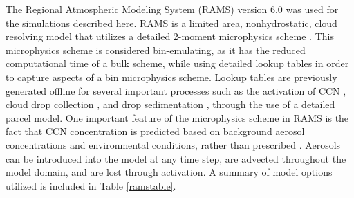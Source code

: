 The Regional Atmospheric Modeling System (RAMS) \citep{Pielke:1992p800,Cotton:2003p72} version 6.0 was used for the simulations described here.  RAMS is a limited area, nonhydrostatic, cloud resolving model that utilizes a detailed 2-moment microphysics scheme \citep{Meyers:1997p81}.  This microphysics scheme is considered bin-emulating, as it has the reduced computational time of a bulk scheme, while using detailed lookup tables in order to capture aspects of a bin microphysics scheme.  Lookup tables are previously generated offline for several important processes such as the activation of CCN \citep{Saleeby:2004p882}, cloud drop collection \citep{Feingold:1988p490}, and drop sedimentation \citep{Feingold:1998p582}, through the use of a detailed parcel model.  One important feature of the microphysics scheme in RAMS is the fact that CCN concentration is predicted based on background aerosol concentrations and environmental conditions, rather than prescribed \citep{Saleeby:2004p882}.  Aerosols can be introduced into the model at any time step, are advected throughout the model domain, and are lost through activation.  A summary of model options utilized is included in Table \ref{ramstable}.

